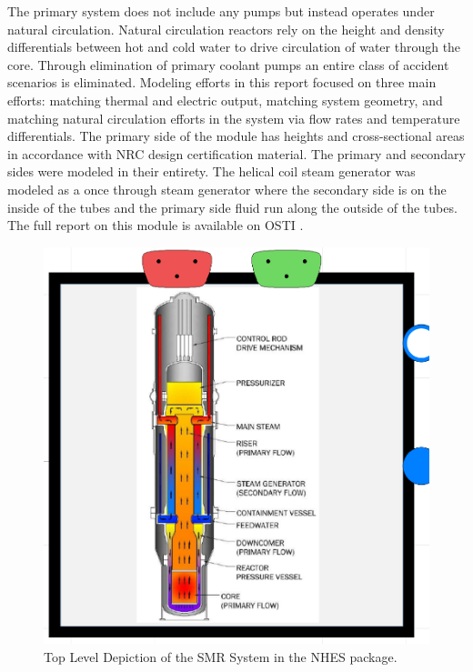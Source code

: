 The primary system does not include any pumps but instead operates under natural circulation. Natural circulation reactors rely on the height and density differentials between hot and cold water to drive circulation of water through the core. Through elimination of primary coolant pumps an entire class of accident scenarios is eliminated. Modeling efforts in this report focused on three main efforts: matching thermal and electric output, matching system geometry, and matching natural circulation efforts in the system via flow rates and temperature differentials. The primary side of the module has heights and cross-sectional areas in accordance with NRC design certification material. The primary and secondary sides were modeled in their entirety. The helical coil steam generator was modeled as a once through steam generator where the secondary side is on the inside of the tubes and the primary side fluid run along the outside of the tubes.  The full report on this module is available on OSTI \cite{2019NuScaleM4}.


\begin{figure}[hbtp]
\centering
\includegraphics[scale=0.3]{pics/NuScale.png}
\caption{Top Level Depiction of the SMR System in the NHES package.}
\label{Top View NuScale Reactor}
\end{figure}

%
